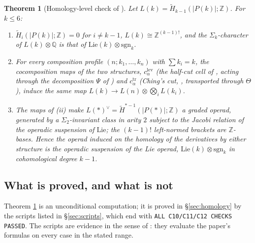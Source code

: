 \documentclass[11pt]{amsart}
\newtheorem{theorem}[subsection]{Theorem}
\theoremstyle{definition}
\theoremstyle{remark}
\newcommand{\Lev}{\mathrm{lev}}
\newcommand{\tr}{\mathrm{tr}}
\newcommand{\Z}{\mathbb{Z}}
\newcommand{\Q}{\mathbb{Q}}
\newcommand{\sgn}{\mathrm{sgn}}
\newcommand{\Hred}{\widetilde{H}}
\begin{document}
\begin{theorem}[Homology-level check of {\cite[Theorem 1.3]{Cl2}}]\label{thm:C}
Let $L(k)=\Hred_{k-1}(|P(k)|;\Z)$. For $k\leq 6$:
\begin{enumerate}[label=(\roman*)]
\item $\Hred_i(|P(k)|;\Z)=0$ for $i\neq k-1$, $L(k)\cong\Z^{(k-1)!}$, and the $\Sigma_k$-character of $L(k)\otimes\Q$ is that of $\mathrm{Lie}(k)\otimes\sgn_k$.
\item For every composition profile $(n;k_1,\dots,k_n)$ with $\sum k_i=k$, the cocomposition maps of the two structures, $c^{\Lev}_\alpha$ (the half-cut cell of \cite[Construction A.67]{Cl2}, acting through the decomposition $\Psi$ of \cite[Lemma 4.4]{Cl2}) and $c^{\tr}_\alpha$ (Ching's cut, \cite[Definition A.31]{Cl2}, transported through $\Theta$), induce the same map $L(k)\to L(n)\otimes\bigotimes_i L(k_i)$.
\item The maps of (ii) make $L(\ast)^{\vee}=\Hred^{\ast-1}(|P(\ast)|;\Z)$ a graded operad, generated by a $\Sigma_2$-invariant class in arity $2$ subject to the Jacobi relation of the operadic suspension of $\mathrm{Lie}$; the $(k-1)!$ left-normed brackets are $\Z$-bases. Hence the operad induced on the homology of the derivatives by either structure is the operadic suspension of the Lie operad, $\mathrm{Lie}(k)\otimes\sgn_k$ in cohomological degree $k-1$.
\end{enumerate}
\end{theorem}

\subsection{What is proved, and what is not}\label{sec:ledger}
Theorem \ref{thm:C} is an unconditional computation; it is proved in \S\ref{sec:homology} by the scripts listed in \S\ref{sec:scripts}, which end with \texttt{ALL C10/C11/C12 CHECKS PASSED}. The scripts are evidence in the sense of \cite[Appendix C]{Cl2}: they evaluate the paper's formulas on every case in the stated range.
\end{document}
